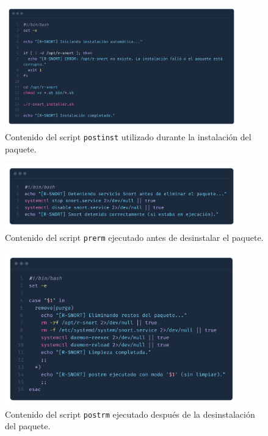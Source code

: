 \documentclass[12pt,a4paper]{report}
\begin{document}
\begin{figure}[H]
	\centering
	\includegraphics[width=0.9\textwidth]{script_automatico/15.png}
	\caption{Contenido del script \texttt{postinst} utilizado durante la instalación del paquete.}
	\label{fig:postinst}
\end{figure}

\begin{figure}[H]
	\centering
	\includegraphics[width=0.9\textwidth]{script_automatico/16.png}
	\caption{Contenido del script \texttt{prerm} ejecutado antes de desinstalar el paquete.}
	\label{fig:prerm}
\end{figure}

\begin{figure}[H]
	\centering
	\includegraphics[width=0.9\textwidth]{script_automatico/17.png}
	\caption{Contenido del script \texttt{postrm} ejecutado después de la desinstalación del paquete.}
	\label{fig:postrm}
\end{figure}
\end{document}
